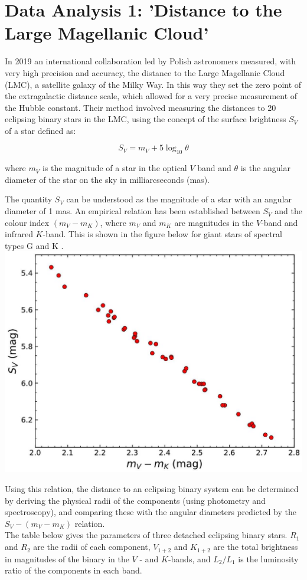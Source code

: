 \documentclass[10pt]{article}
\begin{document}
\section*{Data Analysis 1: 'Distance to the Large Magellanic Cloud'}
In 2019 an international collaboration led by Polish astronomers measured, with very high precision and accuracy, the distance to the Large Magellanic Cloud (LMC), a satellite galaxy of the Milky Way. In this way they set the zero point of the extragalactic distance scale, which allowed for a very precise measurement of the Hubble constant. Their method involved measuring the distances to 20 eclipsing binary stars in the LMC, using the concept of the surface brightness $S_{V}$ of a star defined as:

$$
S_{V}=m_{V}+5 \log _{10} \theta
$$

where $m_{V}$ is the magnitude of a star in the optical $V$ band and $\theta$ is the angular diameter of the star on the sky in milliarcseconds (mas).

The quantity $S_{V}$ can be understood as the magnitude of a star with an angular diameter of 1 mas. An empirical relation has been established between $S_{V}$ and the colour index $\left(m_{V}-m_{K}\right)$, where $m_{V}$ and $m_{K}$ are magnitudes in the $V$-band and infrared $K$-band. This is shown in the figure below for giant stars of spectral types G and K .\\
\includegraphics[max width=\textwidth, center]{2025_09_11_2a6858dd99d789184a35g-02}

Using this relation, the distance to an eclipsing binary system can be determined by deriving the physical radii of the components (using photometry and spectroscopy), and comparing these with the angular diameters predicted by the $S_{V}-\left(m_{V}-m_{K}\right)$ relation.\\
The table below gives the parameters of three detached eclipsing binary stars. $R_{1}$ and $R_{2}$ are the radii of each component, $V_{1+2}$ and $K_{1+2}$ are the total brightness in magnitudes of the binary in the $V$ - and $K$-bands, and $L_{2} / L_{1}$ is the luminosity ratio of the components in each band.
\end{document}

